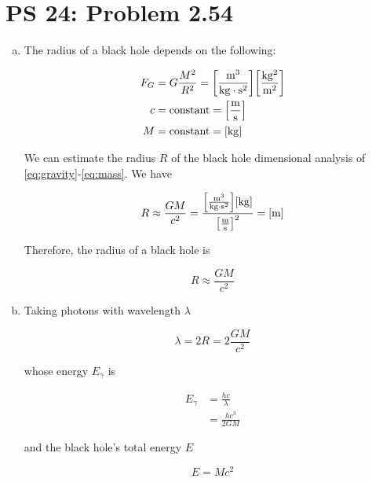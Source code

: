 \documentclass[12pt,a4paper,twocolumn]{article}
\begin{document}
\setcounter{page}{1}

\section*{PS 24: Problem 2.54}
\bigskip

\begin{enumerate}[(a)]

\item The radius of a black hole depends on the following:

\begin{align}
	F_G &= G\frac{M^2}{R^2} = \mathrm{\qty[\frac{m^3}{kg\cdot s^2}]\qty[\frac{kg^2}{m^2}]} \label{eq:gravity} \\
	c &= \mathrm{constant} = \mathrm{\qty[\frac{m}{s}]} \label{eq:light} \\
	M &= \mathrm{constant} = \mathrm{\qty[kg]} \label{eq:mass}
\end{align}

We can estimate the radius $R$ of the black hole dimensional analysis of \eqref{eq:gravity}-\eqref{eq:mass}. We have

\begin{equation}
	R \approx \frac{GM}{c^2} = \mathrm{\frac{\qty[\frac{m^3}{kg\cdot s^2}]\qty[kg]}{\qty[\frac{m}{s}]^2}} = \mathrm{\qty[m]}
\end{equation}

Therefore, the radius of a black hole is

\begin{equation}\label{eq:answer-a}
	\boxed{
		R \approx \frac{GM}{c^2}
	}
\end{equation}

\item Taking photons with wavelength $\lambda$

\begin{equation}\label{eq:wavelen}
	\lambda = 2R = 2\frac{GM}{c^2}
\end{equation}

whose energy $E_\gamma$ is

\begin{align}
	E_\gamma &= \frac{hc}{\lambda} \\
	&= \frac{hc^3}{2GM} \label{eq:photonenergy}
\end{align}

and the black hole's total energy $E$

\begin{equation}\label{eq:totalenergy}
	E = Mc^2%
\end{equation}


\end{enumerate}
\end{document}
